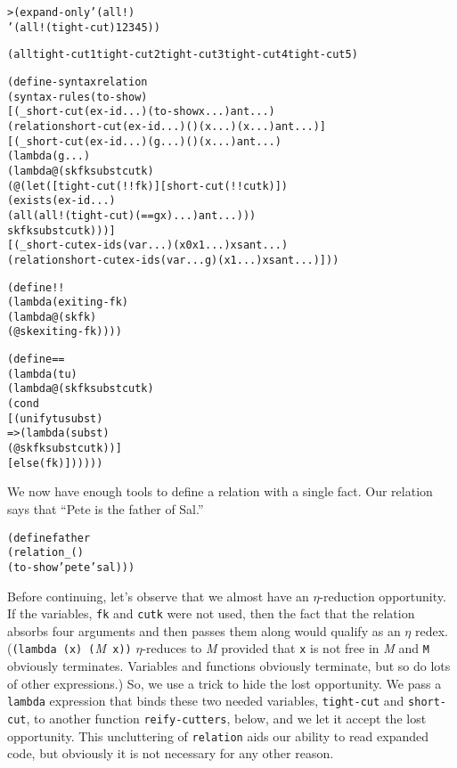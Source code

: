 \begin{alltt}
> (expand-only '(all!) 
    '(all! (tight-cut) 1 2 3 4 5))

(all tight-cut 1 tight-cut 2 tight-cut 3 tight-cut 4 tight-cut 5)
\end{alltt}

\begin{alltt}
(define-syntax relation
  (syntax-rules (to-show)
    [(_ short-cut (ex-id ...) (to-show x ...) ant ...)
     (relation short-cut (ex-id ...) () (x ...) (x ...) ant ...)]
    [(_ short-cut (ex-id ...) (g ...) () (x ...) ant ...)
     (lambda (g ...)
       (lambda@ (sk fk subst cutk)
         (@ (let ([tight-cut (!! fk)] [short-cut (!! cutk)])
              (exists (ex-id ...)
                (all (all! (tight-cut) (== g x) ...) ant ...)))
            sk fk subst cutk)))]
    [(_ short-cut ex-ids (var ...) (x0 x1 ...) xs ant ...)
     (relation short-cut ex-ids (var ... g) (x1 ...) xs ant ...)]))
\end{alltt}
\begin{alltt}
(define !!
  (lambda (exiting-fk)
    (lambda@ (sk fk)
      (@ sk exiting-fk))))
\end{alltt}
\begin{alltt}
(define ==
  (lambda (t u)
    (lambda@ (sk fk subst cutk)
      (cond
        [(unify t u subst)
         => (lambda (subst)
              (@ sk fk subst cutk))]
        [else (fk)])))))
\end{alltt}
\newpage
We now have enough tools to define a relation with a single fact.
Our relation says that ``Pete is the father of Sal.''

\begin{alltt}
(define father  
  (relation _ ()
    (to-show 'pete 'sal)))
\end{alltt}

Before continuing, let's observe that we almost have an
$\eta$-reduction opportunity.  If the variables, \texttt{fk} and
\texttt{cutk} were not used, then the fact that the relation absorbs
four arguments and then passes them along would qualify as an $\eta$
redex.  (\texttt{(lambda (x) (}\emph{M}\texttt{ x))} $\eta$-reduces to
\emph{M} provided that \texttt{x} is not free in \emph{M} and
\texttt{M} obviously terminates.  Variables and functions obviously
terminate, but so do lots of other expressions.)  So, we use a trick
to hide the lost opportunity.  We pass a \texttt{lambda} expression
that binds these two needed variables, \texttt{tight-cut} and
\texttt{short-cut}, to another function \texttt{reify-cutters}, below,
and we let it accept the lost opportunity.  This uncluttering of
\texttt{relation} aids our ability to read expanded code, but
obviously it is not necessary for any other reason.

